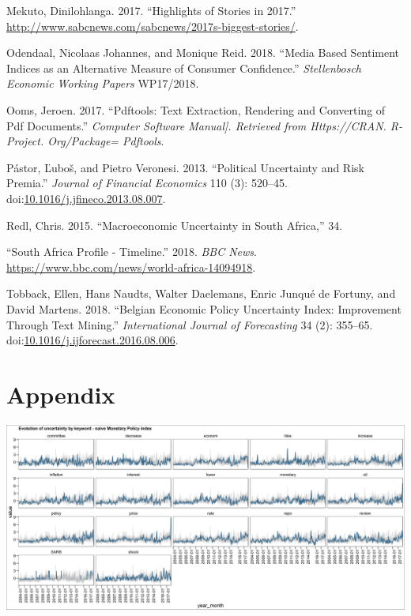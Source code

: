 \documentclass[11pt,preprint, authoryear]{elsarticle}
\let\origfigure\figure
\let\endorigfigure\endfigure
\renewenvironment{figure}[1][2] {
    \expandafter\origfigure\expandafter[H]
} {
    \endorigfigure
}
\numberwithin{equation}{section}
\numberwithin{figure}{section}
\numberwithin{table}{section}
\begin{document}
\hypertarget{ref-Mekuto2017}{}
Mekuto, Dinilohlanga. 2017. ``Highlights of Stories in 2017.''
\url{http://www.sabcnews.com/sabcnews/2017s-biggest-stories/}.

\hypertarget{ref-Odendaal2018}{}
Odendaal, Nicolaas Johannes, and Monique Reid. 2018. ``Media Based
Sentiment Indices as an Alternative Measure of Consumer Confidence.''
\emph{Stellenbosch Economic Working Papers} WP17/2018.

\hypertarget{ref-Ooms2017}{}
Ooms, Jeroen. 2017. ``Pdftools: Text Extraction, Rendering and
Converting of Pdf Documents.'' \emph{Computer Software Manual{]}.
Retrieved from Https://CRAN. R-Project. Org/Package= Pdftools}.

\hypertarget{ref-Pastor2013}{}
Pástor, Ľuboš, and Pietro Veronesi. 2013. ``Political Uncertainty and
Risk Premia.'' \emph{Journal of Financial Economics} 110 (3): 520--45.
doi:\href{https://doi.org/10.1016/j.jfineco.2013.08.007}{10.1016/j.jfineco.2013.08.007}.

\hypertarget{ref-Redl2015}{}
Redl, Chris. 2015. ``Macroeconomic Uncertainty in South Africa,'' 34.

\hypertarget{ref-2018}{}
``South Africa Profile - Timeline.'' 2018. \emph{BBC News}.
\url{https://www.bbc.com/news/world-africa-14094918}.

\hypertarget{ref-Tobback2018}{}
Tobback, Ellen, Hans Naudts, Walter Daelemans, Enric Junqué de Fortuny,
and David Martens. 2018. ``Belgian Economic Policy Uncertainty Index:
Improvement Through Text Mining.'' \emph{International Journal of
Forecasting} 34 (2): 355--65.
doi:\href{https://doi.org/10.1016/j.ijforecast.2016.08.006}{10.1016/j.ijforecast.2016.08.006}.

\newpage

\section*{\texorpdfstring{Appendix
		\label{sec_appendix}}{Results }}\label{appendix}
\begin{figure}
	\centering
	\includegraphics[width=\linewidth, keepaspectratio]{bin/monetary_key_naive}\\
	
	\caption{Composite Monetary Policy uncertainty naive index. \label{fig_mon_key_n}}
\end{figure}
\end{document}
